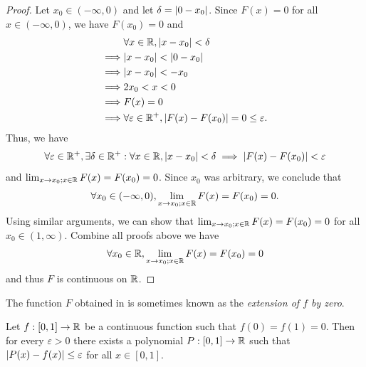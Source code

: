 \begin{proof}
  Let \(x_0 \in (-\infty, 0)\) and let \(\delta = \left\lvert0 - x_0\right\rvert\).
  Since \(F(x) = 0\) for all \(x \in (-\infty, 0)\), we have \(F(x_0) = 0\) and
  \begin{align*}
             & \forall x \in \R, \abs{x - x_0} < \delta                                \\
    \implies & \abs{x - x_0} < \abs{0 - x_0}                                           \\
    \implies & \abs{x - x_0} < -x_0                                                    \\
    \implies & 2x_0 < x < 0                                                            \\
    \implies & F(x) = 0                                                                \\
    \implies & \forall \varepsilon \in \R^+, \abs{F(x) - F(x_0)} = 0 \leq \varepsilon.
  \end{align*}
  Thus, we have
  \[
    \forall \varepsilon \in \mathbb{R}^+, \exists \delta \in \mathbb{R}^+ : \forall x \in \mathbb{R}, \left\lvert x - x_0\right\rvert < \delta \implies \left\lvert F(x) - F(x_0)\right\rvert < \varepsilon
  \]
  and \(\lim_{x \to x_0 ; x \in \mathbb{R}} F(x) = F(x_0) = 0\).
  Since \(x_0\) was arbitrary, we conclude that
  \[
    \forall x_0 \in (-\infty, 0), \lim_{x \to x_0 ; x \in \mathbb{R}} F(x) = F(x_0) = 0.
  \]
  Using similar arguments, we can show that \(\lim_{x \to x_0 ; x \in \mathbb{R}} F(x) = F(x_0) = 0\) for all \(x_0 \in (1, \infty)\).
  Combine all proofs above we have
  \[
    \forall x_0 \in \mathbb{R}, \lim_{x \to x_0 ; x \in \mathbb{R}} F(x) = F(x_0) = 0
  \]
  and thus \(F\) is continuous on \(\mathbb{R}\).
\end{proof}

\begin{rmk}\label{ii:3.8.17}
  The function \(F\) obtained in  is sometimes known as the \emph{extension of \(f\) by zero}.
\end{rmk}

\begin{cor}\label{ii:3.8.18}
  Let \(f : [0, 1] \to \mathbb{R}\) be a continuous function such that \(f(0) = f(1) = 0\).
  Then for every \(\varepsilon > 0\) there exists a polynomial \(P : [0, 1] \to \mathbb{R}\) such that \(\left\lvert P(x) - f(x)\right\rvert \leq \varepsilon\) for all \(x \in [0, 1]\).
\end{cor}

